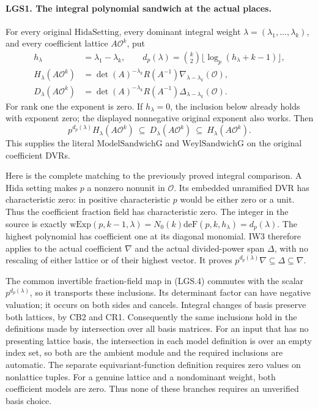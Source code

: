 \paragraph{LGS1. The integral polynomial sandwich at the actual places.}
\label{claim:LGS1}
For every original \(\mathrm{HidaSetting}\), every dominant integral
weight \(\lambda=(\lambda_1,\ldots,\lambda_k)\), and every coefficient
lattice \(A\mathcal O^k\), put
\[
 \begin{split}
 h_\lambda&=\lambda_1-\lambda_k,\qquad
 d_p(\lambda)=\binom{k}{2}\lfloor\log_p(h_\lambda+k-1)\rfloor,\\
 H_\lambda(A\mathcal O^k)
   &=\det(A)^{-\lambda_k}R(A^{-1})
                 \nabla_{\lambda-\lambda_k}(\mathcal O),\\
 D_\lambda(A\mathcal O^k)
   &=\det(A)^{-\lambda_k}R(A^{-1})
                 \Delta_{\lambda-\lambda_k}(\mathcal O).
 \end{split}                                                     \tag{LGS.4}
\]
For rank one the exponent is zero.  If \(h_\lambda=0\), the
inclusion below already holds with exponent zero; the displayed
nonnegative original exponent also works.  Then
\[
       p^{d_p(\lambda)}H_\lambda(A\mathcal O^k)
       \ \subseteq\ D_\lambda(A\mathcal O^k)
       \ \subseteq\ H_\lambda(A\mathcal O^k).            \tag{LGS.5}
\]
This supplies the literal \(\mathrm{ModelSandwichG}\) and
\(\mathrm{WeylSandwichG}\) on the original coefficient DVRs.

Here is the complete matching to the previously proved integral
comparison.  A Hida setting makes \(p\) a nonzero nonunit in
\(\mathcal O\).  Its embedded unramified DVR has characteristic zero:
in positive characteristic \(p\) would be either zero or a unit.
Thus the coefficient fraction field has characteristic zero.
The integer in the source is exactly
\(\mathrm{wExp}(p,k-1,\lambda)
 =N_0(k)\mathrm{deF}(p,k,h_\lambda)=d_p(\lambda)\).
The highest polynomial has coefficient one at its diagonal
monomial.  IW3 therefore applies to the actual coefficient
\(\nabla\) and the actual divided-power span \(\Delta\), with no
rescaling of either lattice or of their highest vector.
It proves \(p^{d_p(\lambda)}\nabla\subseteq\Delta\subseteq\nabla\).

The common invertible fraction-field map in (LGS.4) commutes with
the scalar \(p^{d_p(\lambda)}\), so it transports these inclusions.
Its determinant factor can have negative valuation; it occurs on
both sides and cancels.  Integral changes of basis preserve both
lattices, by CB2 and CR1.  Consequently the same inclusions hold
in the definitions made by intersection over all basis matrices.
For an input that has no presenting lattice basis, the
intersection in each model definition is over an empty
index set, so both are the ambient module and the required
inclusions are automatic.  The separate equivariant-function
definition requires zero values on nonlattice tuples.
For a genuine lattice and a nondominant weight, both
coefficient models are zero.  Thus none of these branches
requires an unverified basis choice.

